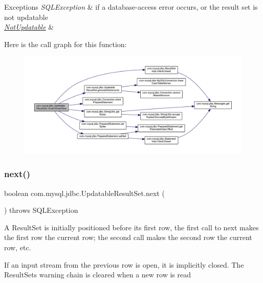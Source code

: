 \begin{DoxyExceptions}{Exceptions}
{\em S\+Q\+L\+Exception} & if a database-\/access error occurs, or the result set is not updatable \\
\hline
{\em \mbox{\hyperlink{classcom_1_1mysql_1_1jdbc_1_1_not_updatable}{Not\+Updatable}}} & \\
\hline
\end{DoxyExceptions}
Here is the call graph for this function\+:
\nopagebreak
\begin{figure}[H]
\begin{center}
\leavevmode
\includegraphics[width=350pt]{classcom_1_1mysql_1_1jdbc_1_1_updatable_result_set_a46ec028d5e4a8f1ca9541177fef43545_cgraph}
\end{center}
\end{figure}
\mbox{\label{classcom_1_1mysql_1_1jdbc_1_1_updatable_result_set_abdc79070aa1242eda4a1e024f3e5e544}} 
\subsubsection{\texorpdfstring{next()}{next()}}
{\footnotesize\ttfamily boolean com.\+mysql.\+jdbc.\+Updatable\+Result\+Set.\+next (\begin{DoxyParamCaption}{ }\end{DoxyParamCaption}) throws S\+Q\+L\+Exception}

A Result\+Set is initially positioned before its first row, the first call to next makes the first row the current row; the second call makes the second row the current row, etc.

If an input stream from the previous row is open, it is implicitly closed. The Result\+Set\textquotesingle{}s warning chain is cleared when a new row is read 

